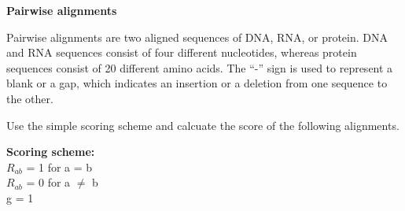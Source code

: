 \question \textbf{Pairwise alignments}
  
Pairwise alignments are two aligned sequences of DNA, RNA, or protein. DNA and RNA sequences consist of four different nucleotides, whereas protein sequences consist of 20 different amino acids. The  ``-'' sign is used to represent a blank or a gap, which indicates an insertion or a deletion from one sequence to the other.

Use the simple scoring scheme and calcuate the score of the following alignments.

\textbf{Scoring scheme: }\\
\null \quad $R_{ab}$ = 1 for a = b \\ 
\null \quad $R_{ab}$ = 0 for a $\neq$ b \\ 
\null \quad g = 1  

\vspace{0.1 in}

